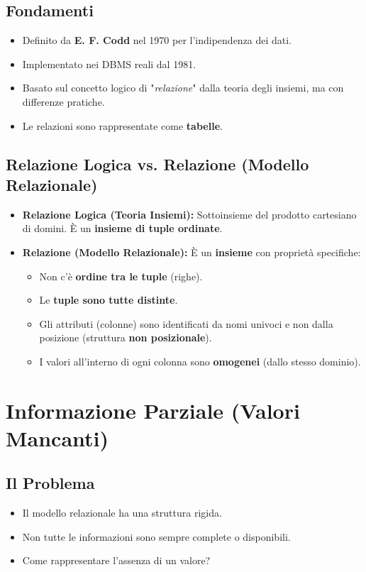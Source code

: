 \documentclass{article}
\begin{document}
	\subsection{Fondamenti}
	\begin{itemize}
		\item Definito da \textbf{E. F. Codd} nel 1970 per l'indipendenza dei dati.
		\item Implementato nei DBMS reali dal 1981.
		\item Basato sul concetto logico di "\textit{relazione}" dalla teoria degli insiemi, ma con differenze pratiche.
		\item Le relazioni sono rappresentate come \textbf{tabelle}.
	\end{itemize}
	
	\subsection{Relazione Logica vs. Relazione (Modello Relazionale)}
	\begin{itemize}
		\item \textbf{Relazione Logica (Teoria Insiemi):} Sottoinsieme del prodotto cartesiano di domini. È un \textbf{insieme di tuple ordinate}.
		\item \textbf{Relazione (Modello Relazionale):} È un \textbf{insieme} con proprietà specifiche:
		\begin{itemize}
			\item Non c'è \textbf{ordine tra le tuple} (righe).
			\item Le \textbf{tuple sono tutte distinte}.
			\item Gli attributi (colonne) sono identificati da nomi univoci e non dalla posizione (struttura \textbf{non posizionale}).
			\item I valori all'interno di ogni colonna sono \textbf{omogenei} (dallo stesso dominio).
		\end{itemize}
	\end{itemize}
	
	\section{Informazione Parziale (Valori Mancanti)}
	
	\subsection{Il Problema}
	\begin{itemize}
		\item Il modello relazionale ha una struttura rigida.
		\item Non tutte le informazioni sono sempre complete o disponibili.
		\item Come rappresentare l'assenza di un valore?
	\end{itemize}
	
\end{document}
